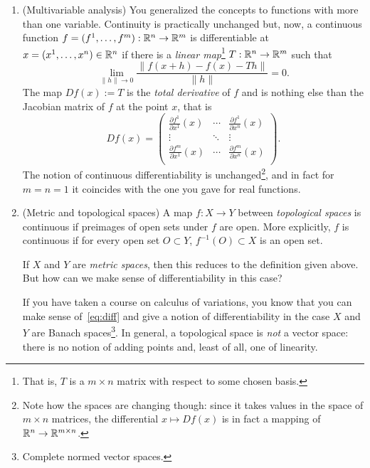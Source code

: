 \begin{enumerate}
  \item (Multivariable analysis) You generalized the concepts to functions with more than one variable.
        Continuity is practically unchanged but, now, a continuous function $f=(f^1, \ldots, f^m):\mathbb{R}^n\to\mathbb{R}^m$ is differentiable at $x=(x^1,\ldots,x^n)\in\mathbb{R}^n$ if there is a \emph{linear map}\footnote{That is, $T$ is a $m\times n$ matrix with respect to some chosen basis.} $T: \mathbb{R}^n\to\mathbb{R}^m$ such that
        \begin{equation}\label{eq:diff}
          \lim_{\|h\|\to 0} \frac{\|f(x+h) - f(x) - T h\|}{\|h\|} = 0.
        \end{equation}
        The map $Df(x) := T$ is the \emph{total derivative} of $f$ and is nothing else than the Jacobian matrix of $f$ at the point $x$, that is
        \begin{equation}\label{eq:jacobian}
          Df(x) = \begin{pmatrix}
            \frac{\partial f^1}{\partial x^1}(x) & \cdots & \frac{\partial f^1}{\partial x^n}(x) \\
            \vdots                               & \ddots & \vdots                               \\
            \frac{\partial f^m}{\partial x^1}(x) & \cdots & \frac{\partial f^m}{\partial x^n}(x) \\
          \end{pmatrix}.
        \end{equation}
        The notion of continuous differentiability is unchanged\footnote{Note how the spaces are changing though: since it takes values in the space of $m\times n$ matrices, the differential $x\mapsto Df(x)$ is in fact a mapping of $\mathbb{R}^n \to \mathbb{R}^{m\times n}$.}, and in fact for $m=n=1$ it coincides with the one you gave for real functions.

  \item (Metric and topological spaces) A map $f:X\to Y$ between \emph{topological spaces} is continuous if preimages of open sets under $f$ are open. More explicitly, $f$ is continuous if for every open set $O\subset Y$, $f^{-1}(O)\subset X$ is an open set.

        If $X$ and $Y$ are \emph{metric spaces}, then this reduces to the definition given above.
        But how can we make sense of differentiability in this case?

        If you have taken a course on calculus of variations, you know that you can make sense of~\eqref{eq:diff} and give a notion of differentiability in the case $X$ and $Y$ are Banach spaces\footnote{Complete normed vector spaces.}.
        In general, a topological space is \emph{not} a vector space: there is no notion of adding points and, least of all, one of linearity.
\end{enumerate}

